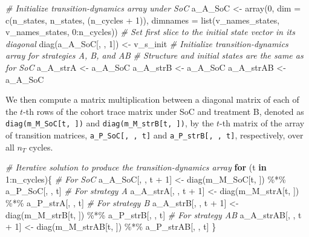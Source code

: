 \documentclass[
]{article}
\newenvironment{Shaded}{\begin{snugshade}}{\end{snugshade}}
\newcommand{\AttributeTok}[1]{\textcolor[rgb]{0.77,0.63,0.00}{#1}}
\newcommand{\CommentTok}[1]{\textcolor[rgb]{0.56,0.35,0.01}{\textit{#1}}}
\newcommand{\ControlFlowTok}[1]{\textcolor[rgb]{0.13,0.29,0.53}{\textbf{#1}}}
\newcommand{\DecValTok}[1]{\textcolor[rgb]{0.00,0.00,0.81}{#1}}
\newcommand{\FunctionTok}[1]{\textcolor[rgb]{0.00,0.00,0.00}{#1}}
\newcommand{\NormalTok}[1]{#1}
\newcommand{\OtherTok}[1]{\textcolor[rgb]{0.56,0.35,0.01}{#1}}
\newcommand{\SpecialCharTok}[1]{\textcolor[rgb]{0.00,0.00,0.00}{#1}}
\begin{document}
\begin{Shaded}
\begin{Highlighting}[]
\CommentTok{\# Initialize transition{-}dynamics array under SoC}
\NormalTok{a\_A\_SoC }\OtherTok{\textless{}{-}} \FunctionTok{array}\NormalTok{(}\DecValTok{0}\NormalTok{,}
             \AttributeTok{dim =} \FunctionTok{c}\NormalTok{(n\_states, n\_states, (n\_cycles }\SpecialCharTok{+} \DecValTok{1}\NormalTok{)),}
             \AttributeTok{dimnames =} \FunctionTok{list}\NormalTok{(v\_names\_states, v\_names\_states, }\DecValTok{0}\SpecialCharTok{:}\NormalTok{n\_cycles))}
\CommentTok{\# Set first slice to the initial state vector in its diagonal}
\FunctionTok{diag}\NormalTok{(a\_A\_SoC[, , }\DecValTok{1}\NormalTok{]) }\OtherTok{\textless{}{-}}\NormalTok{ v\_s\_init}
\CommentTok{\# Initialize transition{-}dynamics array for strategies A, B, and AB}
\CommentTok{\# Structure and initial states are the same as for SoC}
\NormalTok{a\_A\_strA  }\OtherTok{\textless{}{-}}\NormalTok{ a\_A\_SoC}
\NormalTok{a\_A\_strB  }\OtherTok{\textless{}{-}}\NormalTok{ a\_A\_SoC}
\NormalTok{a\_A\_strAB }\OtherTok{\textless{}{-}}\NormalTok{ a\_A\_SoC}
\end{Highlighting}
\end{Shaded}

We then compute a matrix multiplication between a diagonal matrix of each of the \(t\)-th rows of the cohort trace matrix under SoC and treatment B, denoted as \texttt{diag(m\_M\_SoC{[}t,\ {]})} and \texttt{diag(m\_M\_strB{[}t,\ {]})}, by the \(t\)-th matrix of the array of transition matrices, \texttt{a\_P\_SoC{[},\ ,\ t{]}} and \texttt{a\_P\_strB{[},\ ,\ t{]}}, respectively, over all \(n_T\) cycles.

\begin{Shaded}
\begin{Highlighting}[]
\CommentTok{\# Iterative solution to produce the transition{-}dynamics array}
\ControlFlowTok{for}\NormalTok{ (t }\ControlFlowTok{in} \DecValTok{1}\SpecialCharTok{:}\NormalTok{n\_cycles)\{}
  \CommentTok{\# For SoC}
\NormalTok{  a\_A\_SoC[, , t }\SpecialCharTok{+} \DecValTok{1}\NormalTok{] }\OtherTok{\textless{}{-}} \FunctionTok{diag}\NormalTok{(m\_M\_SoC[t, ]) }\SpecialCharTok{\%*\%}\NormalTok{ a\_P\_SoC[, , t]}
  \CommentTok{\# For strategy A}
\NormalTok{  a\_A\_strA[, , t }\SpecialCharTok{+} \DecValTok{1}\NormalTok{] }\OtherTok{\textless{}{-}} \FunctionTok{diag}\NormalTok{(m\_M\_strA[t, ]) }\SpecialCharTok{\%*\%}\NormalTok{ a\_P\_strA[, , t]}
  \CommentTok{\# For strategy B}
\NormalTok{  a\_A\_strB[, , t }\SpecialCharTok{+} \DecValTok{1}\NormalTok{] }\OtherTok{\textless{}{-}} \FunctionTok{diag}\NormalTok{(m\_M\_strB[t, ]) }\SpecialCharTok{\%*\%}\NormalTok{ a\_P\_strB[, , t]}
  \CommentTok{\# For strategy AB}
\NormalTok{  a\_A\_strAB[, , t }\SpecialCharTok{+} \DecValTok{1}\NormalTok{] }\OtherTok{\textless{}{-}} \FunctionTok{diag}\NormalTok{(m\_M\_strAB[t, ]) }\SpecialCharTok{\%*\%}\NormalTok{ a\_P\_strAB[, , t]}
\NormalTok{\}}
\end{Highlighting}
\end{Shaded}
\end{document}

